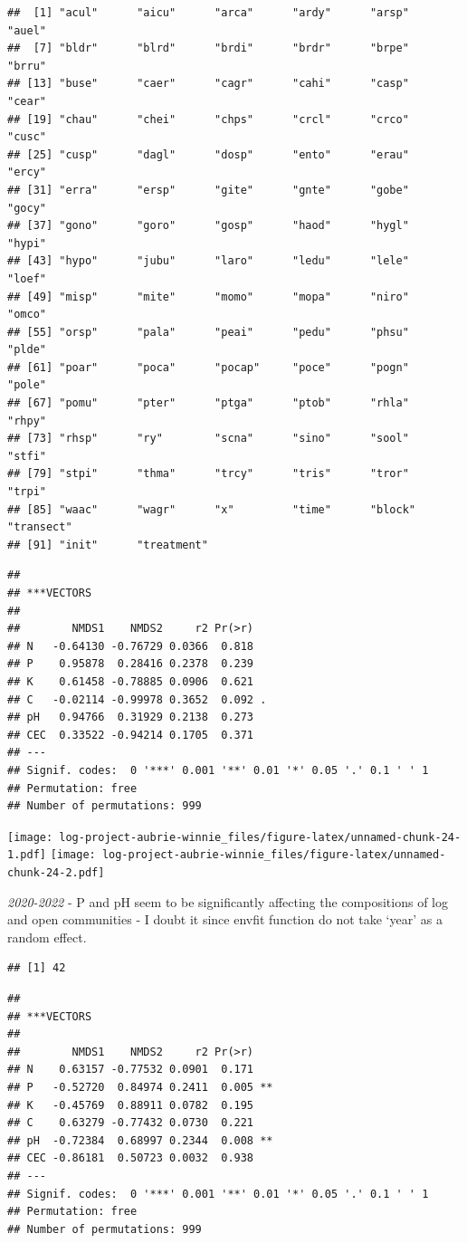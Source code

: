 \documentclass[
]{article}
\begin{document}
\begin{verbatim}
##  [1] "acul"      "aicu"      "arca"      "ardy"      "arsp"      "auel"     
##  [7] "bldr"      "blrd"      "brdi"      "brdr"      "brpe"      "brru"     
## [13] "buse"      "caer"      "cagr"      "cahi"      "casp"      "cear"     
## [19] "chau"      "chei"      "chps"      "crcl"      "crco"      "cusc"     
## [25] "cusp"      "dagl"      "dosp"      "ento"      "erau"      "ercy"     
## [31] "erra"      "ersp"      "gite"      "gnte"      "gobe"      "gocy"     
## [37] "gono"      "goro"      "gosp"      "haod"      "hygl"      "hypi"     
## [43] "hypo"      "jubu"      "laro"      "ledu"      "lele"      "loef"     
## [49] "misp"      "mite"      "momo"      "mopa"      "niro"      "omco"     
## [55] "orsp"      "pala"      "peai"      "pedu"      "phsu"      "plde"     
## [61] "poar"      "poca"      "pocap"     "poce"      "pogn"      "pole"     
## [67] "pomu"      "pter"      "ptga"      "ptob"      "rhla"      "rhpy"     
## [73] "rhsp"      "ry"        "scna"      "sino"      "sool"      "stfi"     
## [79] "stpi"      "thma"      "trcy"      "tris"      "tror"      "trpi"     
## [85] "waac"      "wagr"      "x"         "time"      "block"     "transect" 
## [91] "init"      "treatment"
\end{verbatim}

\begin{verbatim}
## 
## ***VECTORS
## 
##        NMDS1    NMDS2     r2 Pr(>r)  
## N   -0.64130 -0.76729 0.0366  0.818  
## P    0.95878  0.28416 0.2378  0.239  
## K    0.61458 -0.78885 0.0906  0.621  
## C   -0.02114 -0.99978 0.3652  0.092 .
## pH   0.94766  0.31929 0.2138  0.273  
## CEC  0.33522 -0.94214 0.1705  0.371  
## ---
## Signif. codes:  0 '***' 0.001 '**' 0.01 '*' 0.05 '.' 0.1 ' ' 1
## Permutation: free
## Number of permutations: 999
\end{verbatim}

\texttt{[image: log-project-aubrie-winnie\_files/figure-latex/unnamed-chunk-24-1.pdf]}
\texttt{[image: log-project-aubrie-winnie\_files/figure-latex/unnamed-chunk-24-2.pdf]}

\emph{2020-2022} - P and pH seem to be significantly affecting the
compositions of log and open communities - I doubt it since envfit
function do not take `year' as a random effect.

\begin{verbatim}
## [1] 42
\end{verbatim}

\begin{verbatim}
## 
## ***VECTORS
## 
##        NMDS1    NMDS2     r2 Pr(>r)   
## N    0.63157 -0.77532 0.0901  0.171   
## P   -0.52720  0.84974 0.2411  0.005 **
## K   -0.45769  0.88911 0.0782  0.195   
## C    0.63279 -0.77432 0.0730  0.221   
## pH  -0.72384  0.68997 0.2344  0.008 **
## CEC -0.86181  0.50723 0.0032  0.938   
## ---
## Signif. codes:  0 '***' 0.001 '**' 0.01 '*' 0.05 '.' 0.1 ' ' 1
## Permutation: free
## Number of permutations: 999
\end{verbatim}
\end{document}
